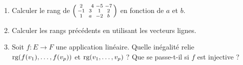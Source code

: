 \begin{frame}
\begin{miniexercice}
\begin{enumerate}
  \item Calculer le rang de $\left(\begin{smallmatrix} 2&\phantom-4&-5&-7 \cr -1&3&1&2 \cr 1&a&-2&b \end{smallmatrix}\right)$ en fonction de
$a$ et $b$.

  \item Calculer les rangs précédents en utilisant les vecteurs lignes.
  
  \item Soit $f:E \to F$ une application linéaire.
Quelle inégalité relie $\mathop{\text{rg}}\nolimits (f(v_1), \ldots ,f(v_p))$
et $\mathop{\text{rg}}\nolimits (v_1, \ldots , v_p)$ ? Que se passe-t-il si $f$ est injective ?
   
\end{enumerate}
\end{miniexercice}

\end{frame}

